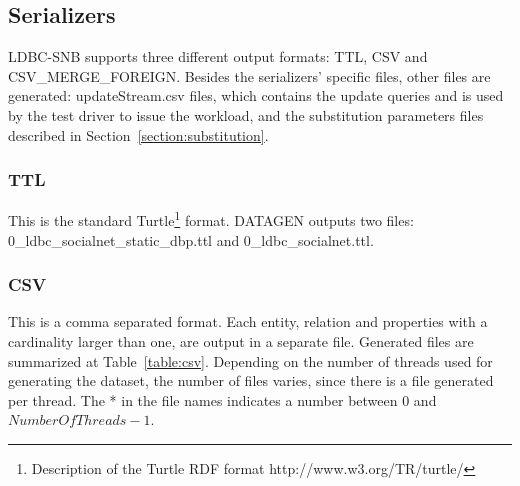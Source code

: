 \subsection{Serializers}\label{section:serializers}

LDBC-SNB supports three different output formats: TTL, CSV and
CSV\_MERGE\_FOREIGN. Besides the serializers' specific files, other files
are generated: updateStream.csv files, which contains the update queries
and is used by the test driver to issue the workload, and the substitution parameters
files described in Section~\ref{section:substitution}.


\subsubsection{TTL}

This is the standard Turtle\footnote{Description of
the Turtle RDF format http://www.w3.org/TR/turtle/} format. DATAGEN outputs
two files: 0\_ldbc\_socialnet\_static\_dbp.ttl and  0\_ldbc\_socialnet.ttl.



\subsubsection{CSV}

This is a comma separated format. Each entity, relation and properties with a
cardinality larger than one, are output in a separate file. Generated files are
summarized at Table~\ref{table:csv}.  Depending on the number of threads used
for generating the dataset, the number of files varies, since there is a file
generated per thread. The * in the file names indicates a number between 0 and
$NumberOfThreads-1$.


